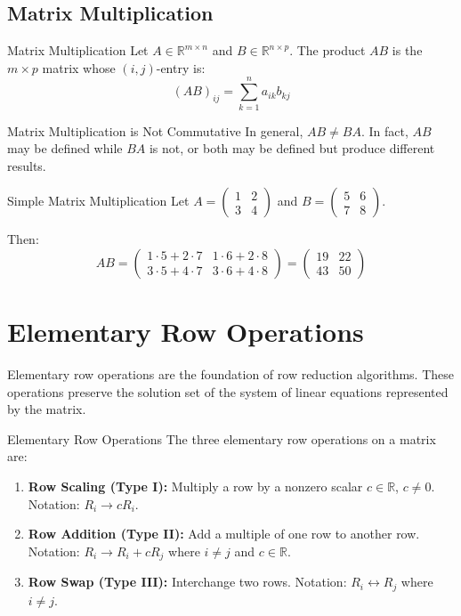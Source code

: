 \documentclass[12pt,a4paper]{article}
\newcommand{\R}{\mathbb{R}}
\begin{document}
	\subsection{Matrix Multiplication}
	
	\begin{definition}{Matrix Multiplication}
		Let $A \in \R^{m \times n}$ and $B \in \R^{n \times p}$. The product $AB$ is the $m \times p$ matrix whose $(i,j)$-entry is:
		\[
		(AB)_{ij} = \sum_{k=1}^{n} a_{ik}b_{kj}
		\]
	\end{definition}
	
	\begin{remark}{Matrix Multiplication is Not Commutative}
		In general, $AB \neq BA$. In fact, $AB$ may be defined while $BA$ is not, or both may be defined but produce different results.
	\end{remark}
	
	\begin{example}{Simple Matrix Multiplication}
		Let $A = \begin{pmatrix} 1 & 2 \\ 3 & 4 \end{pmatrix}$ and $B = \begin{pmatrix} 5 & 6 \\ 7 & 8 \end{pmatrix}$.
		
		Then:
		\[
		AB = \begin{pmatrix} 1 \cdot 5 + 2 \cdot 7 & 1 \cdot 6 + 2 \cdot 8 \\ 3 \cdot 5 + 4 \cdot 7 & 3 \cdot 6 + 4 \cdot 8 \end{pmatrix} = \begin{pmatrix} 19 & 22 \\ 43 & 50 \end{pmatrix}
		\]
	\end{example}
	
	\section{Elementary Row Operations}
	
	Elementary row operations are the foundation of row reduction algorithms. These operations preserve the solution set of the system of linear equations represented by the matrix.
	
	\begin{definition}{Elementary Row Operations}
		The three elementary row operations on a matrix are:
		\begin{enumerate}[label=(\roman*)]
			\item \textbf{Row Scaling (Type I):} Multiply a row by a nonzero scalar $c \in \R$, $c \neq 0$. Notation: $R_i \to cR_i$.
			\item \textbf{Row Addition (Type II):} Add a multiple of one row to another row. Notation: $R_i \to R_i + cR_j$ where $i \neq j$ and $c \in \R$.
			\item \textbf{Row Swap (Type III):} Interchange two rows. Notation: $R_i \leftrightarrow R_j$ where $i \neq j$.
		\end{enumerate}
	\end{definition}
	
\end{document}
